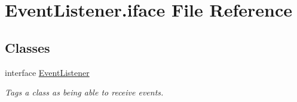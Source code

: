 \hypertarget{EventListener_8iface}{\section{Event\-Listener.\-iface File Reference}
\label{EventListener_8iface}
}
\subsection*{Classes}
\begin{DoxyCompactItemize}
\item 
interface \hyperlink{interfaceEventListener}{Event\-Listener}
\begin{DoxyCompactList}\small\item\em Tags a class as being able to receive events. \end{DoxyCompactList}\end{DoxyCompactItemize}
